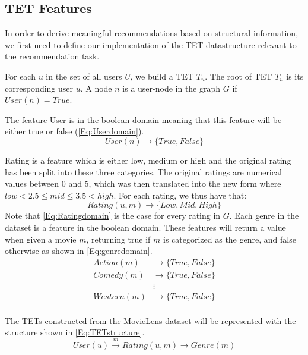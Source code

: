 \subsection{TET Features}\label{Subsec:TET_features}
In order to derive meaningful recommendations based on structural information, we first need to define our implementation of the TET datastructure relevant to the recommendation task. 

For each $u$ in the set of all users $U$, we build a TET $T_u$. The root of TET $T_u$ is its corresponding user $u$.
A node $n$ is a user-node in the graph $G$ if $User(n) = True$.

The feature User is in the boolean domain meaning that this feature will be either true or false (\autoref{Eq:Userdomain}).
\begin{equation}\label{Eq:Userdomain}
  User(n)\rightarrow \{True, False\}
\end{equation}


Rating is a feature which is either low, medium or high and the original rating has been split into these three categories.
The original ratings are numerical values between 0 and 5, which was then translated into the new form where $low<2.5\leq mid \leq 3.5<high$.
For each rating, we thus have that:
\begin{equation}\label{Eq:Ratingdomain}
    Rating(u, m) \rightarrow \{Low, Mid, High\}
\end{equation}
Note that \autoref{Eq:Ratingdomain} is the case for every rating in $G$.
Each genre in the dataset is a feature in the boolean domain. These features will return a value when given a movie $m$, returning true if $m$ is categorized as the genre, and false otherwise as shown in \autoref{Eq:genredomain}.
\begin{equation}\label{Eq:genredomain}
\begin{aligned}
Action(m)& \rightarrow \{True, False\} \\
Comedy(m)& \rightarrow \{True, False\} \\
&\vdots \\
Western(m)& \rightarrow \{True, False\} \\
\end{aligned}
\end{equation}

The TETs constructed from the MovieLens dataset will be represented with the structure shown in \autoref{Eq:TETstructure}.
\begin{equation}\label{Eq:TETstructure}
User(u) \stackrel{m}{\longrightarrow} Rating(u,m) \longrightarrow Genre(m)
\end{equation}

